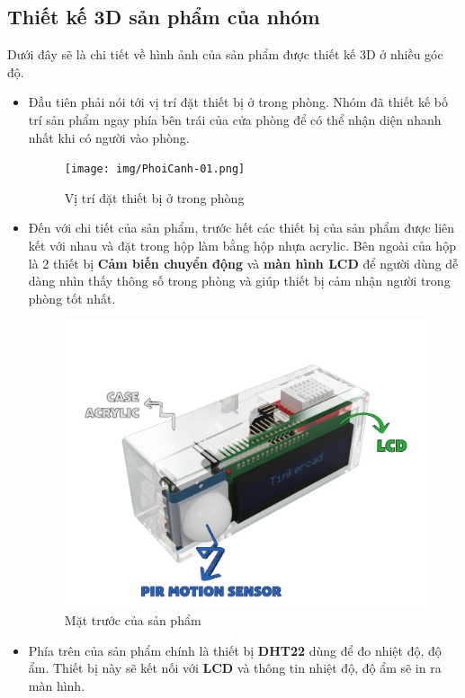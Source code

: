 \documentclass{report}
\begin{document}
\subsection{Thiết kế 3D sản phẩm của nhóm}
Dưới đây sẽ là chi tiết về hình ảnh của sản phẩm được thiết kế 3D ở nhiều góc độ.
\begin{itemize}
    \item Đầu tiên phải nói tới vị trí đặt thiết bị ở trong phòng. Nhóm đã thiết kế bố trí sản phẩm ngay phía bên trái của cửa phòng để có thể nhận diện nhanh nhất khi có người vào phòng.
    \begin{figure}[!h]
        \centering
        \texttt{[image: img/PhoiCanh-01.png]}
        \caption{Vị trí đặt thiết bị ở trong phòng}
    \end{figure}

    \item Đến với chi tiết của sản phẩm, trước hết các thiết bị của sản phẩm được liên kết với nhau và đặt trong hộp làm bằng hộp nhựa acrylic. Bên ngoài của hộp là 2 thiết bị \textbf{Cảm biến chuyển động} và \textbf{màn hình LCD} để người dùng dễ dàng nhìn thấy thông số trong phòng và giúp thiết bị cảm nhận người trong phòng tốt nhất.
    \begin{figure}[!ht]
        \centering
        \includegraphics[width=\textwidth, keepaspectratio]{img/1-01.png}
        \caption{Mặt trước của sản phẩm}
    \end{figure}
    \pagebreak
    \item Phía trên của sản phẩm chính là thiết bị \textbf{DHT22} dùng để  đo nhiệt độ, độ ẩm. Thiết bị này sẽ kết nối với \textbf{LCD} và thông tin nhiệt độ, độ ẩm sẽ in ra màn hình.

\end{itemize}
\end{document}
